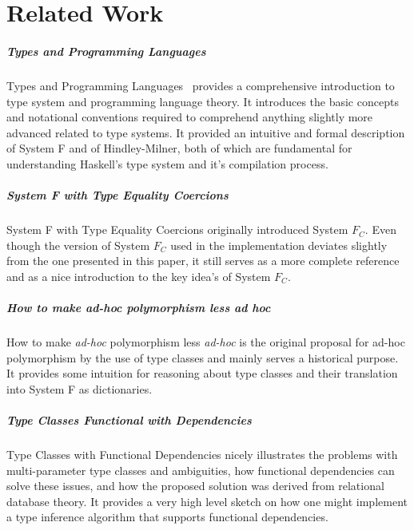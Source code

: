 \chapter{Related Work}

\paragraph{Types and Programming Languages}

Types and Programming Languages~\cite{pierce2002types} provides a comprehensive
introduction to type system and programming
language theory. It introduces the basic concepts and notational conventions
required to comprehend anything slightly more advanced related to type systems.
It provided an intuitive and formal description of System F and of
Hindley-Milner, both of which are fundamental for understanding Haskell's type
system and it's compilation process.

\paragraph{System F with Type Equality Coercions}

System F with Type Equality Coercions\cite{Sulzmann:2007:SFT:1190315.1190324}
originally introduced System $F_C$. Even though the version of System $F_C$ used
in the implementation deviates slightly from the one presented in this paper, it
still serves as a more complete reference and as a nice introduction to the key
idea's of System $F_C$.

\paragraph{How to make \textit{ad-hoc} polymorphism less \textit{ad hoc}}

How to make \textit{ad-hoc} polymorphism less
\textit{ad-hoc}\cite{Wadler:1989:MAP:75277.75283} is the original
proposal for ad-hoc polymorphism by the use of type classes and mainly serves a
historical purpose. It provides some intuition for reasoning about type classes
and their translation into System F as dictionaries.

\paragraph{Type Classes Functional with Dependencies}

Type Classes with Functional Dependencies\cite{Jones00typeclasses} nicely
illustrates the problems with multi-parameter type classes and ambiguities, how
functional dependencies can solve these issues, and how the proposed solution
was derived from relational database theory. It provides a very high level
sketch on how one might implement a type inference algorithm that supports
functional dependencies.

